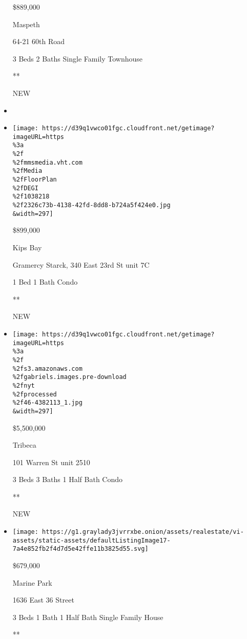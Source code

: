 \begin{itemize}
  \$889,000

  Maspeth

  64-21 60th Road

  3 Beds \textbar{} 2 Baths \textbar{} Single Family Townhouse

  **

  NEW
\item
\item
  \href{/real-estate/usa/ny/new-york/kips-bay/homes-for-sale/gramercy-starck-340-east-23rd-st/46-4381885?}{}

  \texttt{[image: https://d39q1vwco01fgc.cloudfront.net/getimage?imageURL=https\\\%3a\\\%2f\\\%2fmmsmedia.vht.com\\\%2fMedia\\\%2fFloorPlan\\\%2fDEGI\\\%2f1038218\\\%2f2326c73b-4138-42fd-8dd8-b724a5f424e0.jpg\\\&width=297]}

  \$899,000

  Kips Bay

  Gramercy Starck, 340 East 23rd St unit 7C

  1 Bed \textbar{} 1 Bath \textbar{} Condo

  **

  NEW
\item
  \href{/real-estate/usa/ny/new-york/tribeca/homes-for-sale/101-warren-st/46-4382113?}{}

  \texttt{[image: https://d39q1vwco01fgc.cloudfront.net/getimage?imageURL=https\\\%3a\\\%2f\\\%2fs3.amazonaws.com\\\%2fgabriels.images.pre-download\\\%2fnyt\\\%2fprocessed\\\%2f46-4382113\_1.jpg\\\&width=297]}

  \$5,500,000

  Tribeca

  101 Warren St unit 2510

  3 Beds \textbar{} 3 Baths \textbar{} 1 Half Bath \textbar{} Condo

  **

  NEW
\item
  \href{/real-estate/usa/ny/brooklyn/marine-park/homes-for-sale/1636-east-36-street/15101-5537237?}{}

  \texttt{[image: https://g1.graylady3jvrrxbe.onion/assets/realestate/vi-assets/static-assets/defaultListingImage17-7a4e852fb2f4d7d5e42ffe11b3825d55.svg]}

  \$679,000

  Marine Park

  1636 East 36 Street

  3 Beds \textbar{} 1 Bath \textbar{} 1 Half Bath \textbar{} Single
  Family House

  **


\end{itemize}
